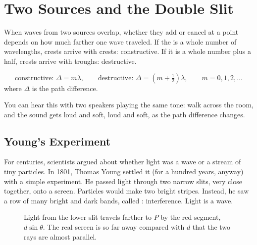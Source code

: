 \section{Two Sources and the Double Slit}
When waves from two sources overlap, whether they add or cancel at a point depends on how much farther one
wave traveled. If the  is a whole number of wavelengths, crests arrive with crests:
constructive. If it is a whole number plus a half, crests arrive with troughs: destructive.

\begin{mdframed}[style = important, frametitle = {Two-Source Interference}]
$$\text{constructive: } \Delta = m\lambda, \qquad \text{destructive: } \Delta = \left(m + \tfrac{1}{2}\right)\lambda, \qquad m = 0, 1, 2, \dots$$
where $\Delta$ is the path difference.
\end{mdframed}

You can hear this with two speakers playing the same tone: walk across the room, and the sound gets loud and
soft, loud and soft, as the path difference changes.

\subsection{Young's Experiment}
For centuries, scientists argued about whether light was a wave or a stream of tiny particles. In 1801, Thomas
Young settled it (for a hundred years, anyway) with a simple experiment. He passed light through two narrow
slits, very close together, onto a screen. Particles would make two bright stripes. Instead, he saw a row of
many bright and dark bands, called : interference. Light is a wave.

\begin{figure}[H]
\centering
{}
\caption{Light from the lower slit travels farther to $P$ by the red segment, $d\sin\theta$. The real
screen is so far away compared with $d$ that the two rays are almost parallel.}
\label{fig:double-slit-geometry}
\end{figure}

